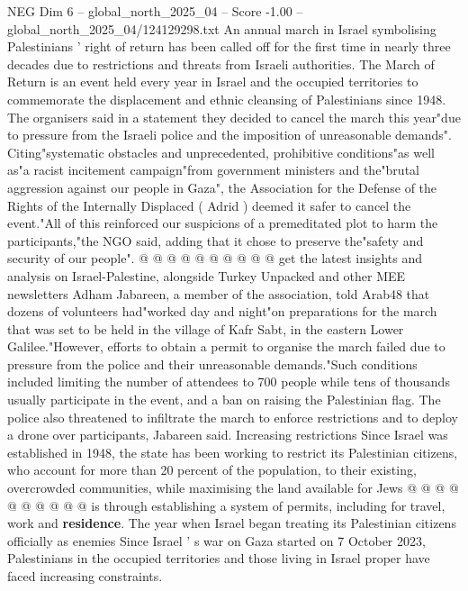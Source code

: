 \begin{textsample}{NEG Dim 6 – global\_north\_2025\_04 – Score -1.00 – global\_north\_2025\_04/124129298.txt}  \label{ex:f6_neg_259}
An annual march in Israel symbolising Palestinians ' right of return has been called off for the first time in nearly three decades due to restrictions and threats from Israeli authorities.
The March of Return is an event held every year in Israel and the occupied territories to commemorate the displacement and ethnic cleansing of Palestinians since 1948.
The organisers said in a statement they decided to cancel the march this year"due to pressure from the Israeli police and the imposition of unreasonable demands".
Citing"systematic obstacles and unprecedented, prohibitive conditions"as well as"a racist incitement campaign"from government ministers and the"brutal aggression against our people in Gaza", the Association for the Defense of the Rights of the Internally Displaced ( Adrid ) deemed it safer to cancel the event."All of this reinforced our suspicions of a premeditated plot to harm the participants,"the NGO said, adding that it chose to preserve the"safety and security of our people". @ @ @ @ @ @ @ @ @ @ get the latest insights and analysis on Israel-Palestine, alongside Turkey Unpacked and other MEE newsletters Adham Jabareen, a member of the association, told Arab48 that dozens of volunteers had"worked day and night"on preparations for the march that was set to be held in the village of Kafr Sabt, in the eastern Lower Galilee."However, efforts to obtain a permit to organise the march failed due to pressure from the police and their unreasonable demands."Such conditions included limiting the number of attendees to 700 people while tens of thousands usually participate in the event, and a ban on raising the Palestinian flag.
The police also threatened to infiltrate the march to enforce restrictions and to deploy a drone over participants, Jabareen said.
Increasing restrictions Since Israel was established in 1948, the state has been working to restrict its Palestinian citizens, who account for more than 20 percent of the population, to their existing, overcrowded communities, while maximising the land available for Jews @ @ @ @ @ @ @ @ @ @ is through establishing a system of permits, including for travel, work and \textbf{residence}.
The year when Israel began treating its Palestinian citizens officially as enemies Since Israel ' s war on Gaza started on 7 October 2023, Palestinians in the occupied territories and those living in Israel proper have faced increasing constraints.

\end{textsample}
